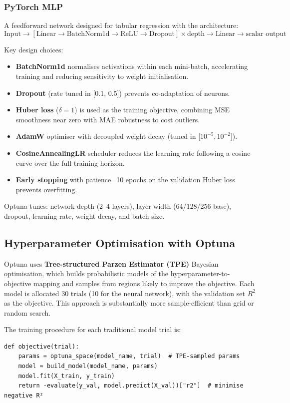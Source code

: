 \documentclass[11pt,a4paper]{article}
\begin{document}
\subsubsection{PyTorch MLP}
A feedforward network designed for tabular regression with the architecture:
\[
\text{Input} \rightarrow [\text{Linear} \rightarrow \text{BatchNorm1d} \rightarrow \text{ReLU} \rightarrow \text{Dropout}] \times \text{depth} \rightarrow \text{Linear} \rightarrow \text{scalar output}
\]

Key design choices:
\begin{itemize}
  \item \textbf{BatchNorm1d} normalises activations within each mini-batch, accelerating training and reducing sensitivity to weight initialisation.
  \item \textbf{Dropout} (rate tuned in [0.1, 0.5]) prevents co-adaptation of neurons.
  \item \textbf{Huber loss} ($\delta = 1$) is used as the training objective, combining MSE smoothness near zero with MAE robustness to cost outliers.
  \item \textbf{AdamW} optimiser with decoupled weight decay (tuned in [$10^{-5}, 10^{-2}$]).
  \item \textbf{CosineAnnealingLR} scheduler reduces the learning rate following a cosine curve over the full training horizon.
  \item \textbf{Early stopping} with patience=10 epochs on the validation Huber loss prevents overfitting.
\end{itemize}

Optuna tunes: network depth (2--4 layers), layer width (64/128/256 base), dropout, learning rate, weight decay, and batch size.

\subsection{Hyperparameter Optimisation with Optuna}
Optuna uses \textbf{Tree-structured Parzen Estimator (TPE)} Bayesian optimisation, which builds probabilistic models of the hyperparameter-to-objective mapping and samples from regions likely to improve the objective. Each model is allocated 30 trials (10 for the neural network), with the validation set $R^2$ as the objective. This approach is substantially more sample-efficient than grid or random search.

The training procedure for each traditional model trial is:
\begin{verbatim}
def objective(trial):
    params = optuna_space(model_name, trial)  # TPE-sampled params
    model = build_model(model_name, params)
    model.fit(X_train, y_train)
    return -evaluate(y_val, model.predict(X_val))["r2"]  # minimise negative R²
\end{verbatim}
\end{document}

